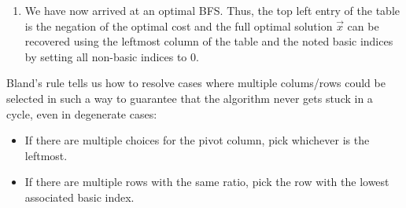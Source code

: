 \documentclass[../main.tex]{subfiles}
\begin{document}
\begin{enumerate}
\begin{enumerate}
        {\color{gray}(This is because after moving to our new point, this basic entry will be 0 and $j$ will replace it as a new basic index)}
      \item Find and perform row operations (scaling rows and adding one row to another) \textbf{on the entire current tableau} so that the pivot entry is 1 and all other entries in the $j$-th column (including $\overline{c}_j$) are 0.
        We do this by first scaling the pivot row so that the pivot cell is 1 and then adding multiples of the pivot row to the other rows so that their $j$-th column entries are 0.

        Instead of updating the values in the current table, instead write the new entries into the fresh tableau.

        {\color{gray}(This is equivalent to updating all the data in the \textbf{entire} table to be correct for the new BFS found by the algorithm -- the equivalence of this step is not proved within this course)}
    \end{enumerate}
  \item We have now arrived at an optimal BFS.
    Thus, the top left entry of the table is the negation of the optimal cost and the full optimal solution $\vec{x}$ can be recovered using the leftmost column of the table and the noted basic indices by setting all non-basic indices to 0.
\end{enumerate}
\begin{remark}
  Bland's rule tells us how to resolve cases where multiple colums/rows could be selected in such a way to guarantee that the algorithm never gets stuck in a cycle, even in degenerate cases:
  \begin{itemize}
    \item If there are multiple choices for the pivot column, pick whichever is the leftmost.
    \item If there are multiple rows with the same ratio, pick the row with the lowest associated basic index.
  \end{itemize}
\end{remark}
\end{document}
